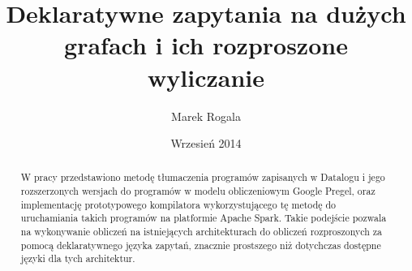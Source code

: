 \documentclass{pracamgr}
\author{Marek Rogala}
\title{Deklaratywne zapytania na dużych grafach i ich rozproszone wyliczanie}
\date{Wrzesień 2014}
\theoremstyle{plain}
\theoremstyle{definition}
\theoremstyle{remark}
\begin{document}
\maketitle

\begin{abstract}
W pracy przedstawiono metodę tłumaczenia programów zapisanych w Datalogu
i jego rozszerzonych wersjach do programów w modelu obliczeniowym Google Pregel,
oraz implementację prototypowego kompilatora wykorzystującego tę metodę do uruchamiania takich programów na platformie Apache Spark.
Takie podejście pozwala na wykonywanie obliczeń na istniejących architekturach do obliczeń rozproszonych
za pomocą deklaratywnego języka zapytań, znacznie prostszego niż dotychczas dostępne języki dla tych architektur.
\end{abstract}

\tableofcontents
















\end{document}
